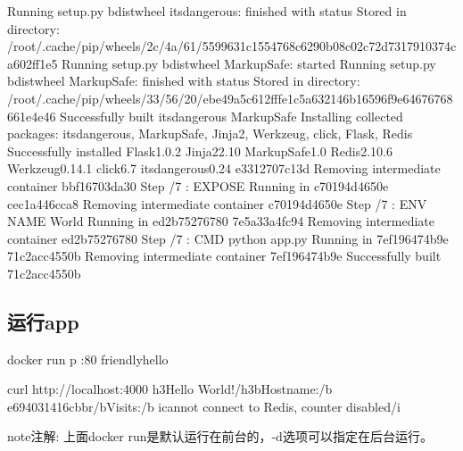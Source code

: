 \documentclass[letterpaper,10pt,english]{sphinxmanual}
\begin{document}
\begin{sphinxVerbatim}[commandchars=\\\{\}]
Running setup.py bdist\PYGZus{}wheel  itsdangerous: finished with status 
Stored in directory: /root/.cache/pip/wheels/2c/4a/61/5599631c1554768c6290b08c02c72d7317910374ca602ff1e5
Running setup.py bdist\PYGZus{}wheel  MarkupSafe: started
Running setup.py bdist\PYGZus{}wheel  MarkupSafe: finished with status 
Stored in directory: /root/.cache/pip/wheels/33/56/20/ebe49a5c612fffe1c5a632146b16596f9e64676768661e4e46
Successfully built itsdangerous MarkupSafe
Installing collected packages: itsdangerous, MarkupSafe, Jinja2, Werkzeug, click, Flask, Redis
Successfully installed Flask\PYGZhy{}1.0.2 Jinja2\PYGZhy{}2.10 MarkupSafe\PYGZhy{}1.0 Redis\PYGZhy{}2.10.6 Werkzeug\PYGZhy{}0.14.1 click\PYGZhy{}6.7 itsdangerous\PYGZhy{}0.24
\PYGZhy{}\PYGZhy{}\PYGZhy{}\PYGZgt{} e3312707c13d
Removing intermediate container bbf16703da30
Step /7 : EXPOSE 
\PYGZhy{}\PYGZhy{}\PYGZhy{}\PYGZgt{} Running in c70194d4650e
\PYGZhy{}\PYGZhy{}\PYGZhy{}\PYGZgt{} cec1a446cca8
Removing intermediate container c70194d4650e
Step /7 : ENV NAME World
\PYGZhy{}\PYGZhy{}\PYGZhy{}\PYGZgt{} Running in ed2b75276780
\PYGZhy{}\PYGZhy{}\PYGZhy{}\PYGZgt{} 7e5a33a4fc94
Removing intermediate container ed2b75276780
Step /7 : CMD python app.py
\PYGZhy{}\PYGZhy{}\PYGZhy{}\PYGZgt{} Running in 7ef196474b9e
\PYGZhy{}\PYGZhy{}\PYGZhy{}\PYGZgt{} 71c2acc4550b
Removing intermediate container 7ef196474b9e
Successfully built 71c2acc4550b
\end{sphinxVerbatim}


\subsection{运行app}
\label{\detokenize{_u5feb_u901f_u5165_u95e8/02-_u5bb9_u5668:app}}
%
\begin{sphinxVerbatim}[commandchars=\\\{\}]
docker run \PYGZhy{}p :80 friendlyhello

curl http://localhost:4000
\PYGZlt{}h3\PYGZgt{}Hello World!\PYGZlt{}/h3\PYGZgt{}\PYGZlt{}b\PYGZgt{}Hostname:\PYGZlt{}/b\PYGZgt{} e694031416cb\PYGZlt{}br/\PYGZgt{}\PYGZlt{}b\PYGZgt{}Visits:\PYGZlt{}/b\PYGZgt{} \PYGZlt{}i\PYGZgt{}cannot connect to Redis, counter disabled\PYGZlt{}/i\PYGZgt{}
\end{sphinxVerbatim}

\begin{sphinxadmonition}{note}{注解:}
上面docker run是默认运行在前台的，-d选项可以指定在后台运行。
\end{sphinxadmonition}
\end{document}
